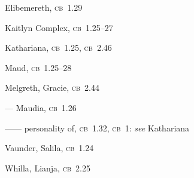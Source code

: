 \documentclass{article}
\newcommand{\theentry}[1]{#1}
\begin{document}
    \begin{theindex}



\item \theentry{Elibemereth}, \textsc{cb}~1.29

\item \theentry{Kaitlyn Complex}, \textsc{cb}~1.25--27

\item \theentry{Kathariana}, \textsc{cb}~1.25, \textsc{cb}~2.46

\item \theentry{Maud}, \textsc{cb}~1.25--28

\item \theentry{Melgreth, Gracie}, \textsc{cb}~2.44

\item \theentry{--- Maudia}, \textsc{cb}~1.26

\item \theentry{------ personality of}, \textsc{cb}~1.32, \textsc{cb}~1: \emph{see} Kathariana

\item \theentry{Vaunder, Salila}, \textsc{cb}~1.24

\item \theentry{Whilla, Lianja}, \textsc{cb}~2.25


\end{theindex}
\end{document}
